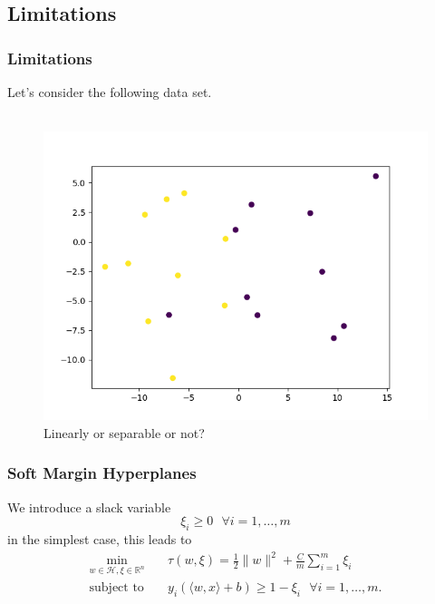\documentclass{beamer}
\begin{document}
\subsection{Limitations}

\begin{frame}{}
	\frametitle{Limitations}
	Let's consider the following data set. \\~\\ 
	\begin{figure}
		\centering
		\includegraphics[width=0.7\linewidth]{img/SlackData}
		\caption{Linearly or separable or not?}
		\label{fig:slackdata}
	\end{figure}
\end{frame}

\begin{frame}{}
	\frametitle{Soft Margin Hyperplanes}
	We introduce a slack variable
	\begin{equation}
		\xi_{ i } \geq 0 \text{ } \forall i = {1, \dots, m}
	\end{equation}
	in the simplest case, this leads to 
	\begin{equation}
		\begin{aligned}
			\min_{w \in \mathcal{H}, \xi \in \mathbb{R}^{n}} \quad & \tau (w, \xi) = \frac{1}{2} \lVert w \rVert^2 + \frac{C}{m} \sum_{i=1}^{m} \xi_{i} \\
			\textrm{subject to} \quad & y_{i} \left( \langle w,x \rangle + b \right) \geq 1 - \xi_{i} \text{ } \forall i = {1, \dots, m}. 
		\end{aligned}
	\end{equation}
\end{frame}
\end{document}
